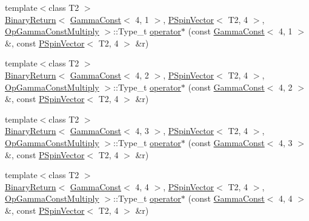 \begin{DoxyCompactItemize}
\item 
{\footnotesize template$<$class T2 $>$ }\\\mbox{\hyperlink{structENSEM_1_1BinaryReturn}{Binary\+Return}}$<$ \mbox{\hyperlink{classENSEM_1_1GammaConst}{Gamma\+Const}}$<$ 4, 1 $>$, \mbox{\hyperlink{classENSEM_1_1PSpinVector}{P\+Spin\+Vector}}$<$ T2, 4 $>$, \mbox{\hyperlink{structENSEM_1_1OpGammaConstMultiply}{Op\+Gamma\+Const\+Multiply}} $>$\+::Type\+\_\+t \mbox{\hyperlink{group__primspinvector_ga78fc0ed12245c6b5e7ab51e07bd4c553}{operator$\ast$}} (const \mbox{\hyperlink{classENSEM_1_1GammaConst}{Gamma\+Const}}$<$ 4, 1 $>$ \&, const \mbox{\hyperlink{classENSEM_1_1PSpinVector}{P\+Spin\+Vector}}$<$ T2, 4 $>$ \&r)
\item 
{\footnotesize template$<$class T2 $>$ }\\\mbox{\hyperlink{structENSEM_1_1BinaryReturn}{Binary\+Return}}$<$ \mbox{\hyperlink{classENSEM_1_1GammaConst}{Gamma\+Const}}$<$ 4, 2 $>$, \mbox{\hyperlink{classENSEM_1_1PSpinVector}{P\+Spin\+Vector}}$<$ T2, 4 $>$, \mbox{\hyperlink{structENSEM_1_1OpGammaConstMultiply}{Op\+Gamma\+Const\+Multiply}} $>$\+::Type\+\_\+t \mbox{\hyperlink{group__primspinvector_ga89998f51b7e59a05842c92f95ca427e4}{operator$\ast$}} (const \mbox{\hyperlink{classENSEM_1_1GammaConst}{Gamma\+Const}}$<$ 4, 2 $>$ \&, const \mbox{\hyperlink{classENSEM_1_1PSpinVector}{P\+Spin\+Vector}}$<$ T2, 4 $>$ \&r)
\item 
{\footnotesize template$<$class T2 $>$ }\\\mbox{\hyperlink{structENSEM_1_1BinaryReturn}{Binary\+Return}}$<$ \mbox{\hyperlink{classENSEM_1_1GammaConst}{Gamma\+Const}}$<$ 4, 3 $>$, \mbox{\hyperlink{classENSEM_1_1PSpinVector}{P\+Spin\+Vector}}$<$ T2, 4 $>$, \mbox{\hyperlink{structENSEM_1_1OpGammaConstMultiply}{Op\+Gamma\+Const\+Multiply}} $>$\+::Type\+\_\+t \mbox{\hyperlink{group__primspinvector_gade157607bce53ec9ffcde3e07f772efb}{operator$\ast$}} (const \mbox{\hyperlink{classENSEM_1_1GammaConst}{Gamma\+Const}}$<$ 4, 3 $>$ \&, const \mbox{\hyperlink{classENSEM_1_1PSpinVector}{P\+Spin\+Vector}}$<$ T2, 4 $>$ \&r)
\item 
{\footnotesize template$<$class T2 $>$ }\\\mbox{\hyperlink{structENSEM_1_1BinaryReturn}{Binary\+Return}}$<$ \mbox{\hyperlink{classENSEM_1_1GammaConst}{Gamma\+Const}}$<$ 4, 4 $>$, \mbox{\hyperlink{classENSEM_1_1PSpinVector}{P\+Spin\+Vector}}$<$ T2, 4 $>$, \mbox{\hyperlink{structENSEM_1_1OpGammaConstMultiply}{Op\+Gamma\+Const\+Multiply}} $>$\+::Type\+\_\+t \mbox{\hyperlink{group__primspinvector_gaa8429bcfc1a7a130ec526f34f8b08c20}{operator$\ast$}} (const \mbox{\hyperlink{classENSEM_1_1GammaConst}{Gamma\+Const}}$<$ 4, 4 $>$ \&, const \mbox{\hyperlink{classENSEM_1_1PSpinVector}{P\+Spin\+Vector}}$<$ T2, 4 $>$ \&r)

\end{DoxyCompactItemize}
